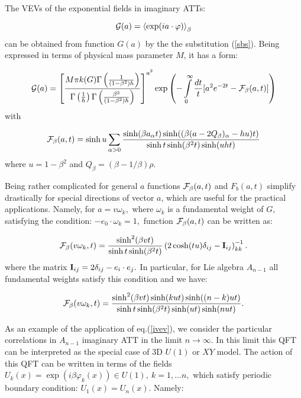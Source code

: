 \documentclass[a4paper,12pt]{article}
\begin{document}
The VEVs of the exponential fields in imaginary ATTs:

\begin{equation}
{\cal G}(a)=\left\langle \exp (ia\cdot \varphi )\right\rangle _\beta
\label{gim}
\end{equation}
can be obtained from function $G(a)$ by the the substitution (\ref{sbs}). Being expressed in terms of
physical mass parameter $M$, it has a form:

\begin{equation}
{\cal G}(a)=\left[ \frac{M\pi k(G)\Gamma \left( \frac 1{(1-\beta ^2)h}
\right) }{\Gamma \left( \frac 1h\right) \Gamma \left( \frac{\beta ^2}
{(1-\beta ^2)h}\right) }\right] ^{a^2}\exp \left( -\int\limits_0^\infty 
\frac{dt}t[a^2e^{-2t}-
{\cal F}_\beta (a,t)]\right)  \label{ivev}
\end{equation}
with

\begin{equation}
{\cal F}_\beta (a,t)=\sinh u\sum_{\alpha >0}\frac{\sinh (\beta a_\alpha
t)\sinh ((\beta (a-2Q_\beta )_\alpha -hu)t)}{\sinh t\sinh (\beta ^2t)\sinh
(uht)}  \label{ifb}
\end{equation}
where $u=1-\beta ^2$ and $Q_\beta =(\beta -1/\beta )\rho .$

Being rather complicated for general $a$ functions ${\cal F}_\beta (a,t)$
and $F_b(a,t)$ simplify drastically for special directions of vector $a$,
which are useful for the practical applications. Namely, for $a=v\omega _k,$
where $\omega _k$ is a fundamental weight of $G,$ satisfying the condition: 
$-e_0\cdot \omega _k=1,$ function ${\cal F}_\beta (a,t)$ can be written as:

\begin{equation}
{\cal F}_\beta (v\omega _k,t)=\frac{\sinh ^2(\beta vt)}{\sinh t\sinh (\beta
^2t)}\left( 2\cosh (tu)\delta _{ij}-{\bf I}_{ij}\right) _{kk}^{-1}.
\label{inc}
\end{equation}
where the matrix ${\bf I}_{ij}=2\delta _{ij}-e_i\cdot e_j.$ In particular,
for Lie algebra $A_{n-1}$ all fundamental weights satisfy this condition and
we have:

\begin{equation}
{\cal F}_\beta (v\omega _k,t)=\frac{\sinh ^2(\beta vt)\sinh (kut)\sinh
((n-k)ut)}{\sinh t\sinh (\beta ^2t)\sinh (ut)\sinh (nut)}.  \label{fan}
\end{equation}

As an example of the application of eq.(\ref{ivev}), we consider the
particular correlations in $A_{n-1}$ imaginary ATT in the limit 
$n\rightarrow \infty .$ In this limit this QFT can be interpreted as the
special case of 3D $U(1)$ or $XY$ model. The action of this QFT can be
written in terms of the fields $U_k(x)=\exp (i\beta \varphi _k(x))\in U(1),\
k=1,...n,$ which satisfy periodic boundary condition: $U_1(x)=U_n(x).$
Namely:
\end{document}
